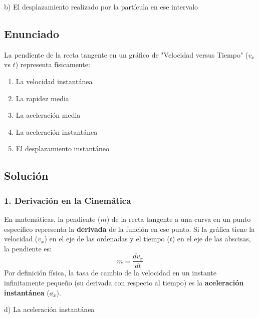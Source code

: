 \documentclass[12pt, a4paper]{article}
\begin{document}
\begin{tcolorbox}[colback=green!5!white, colframe=green!50!black, title=Respuesta Final]
\centering \Large b) El desplazamiento realizado por la partícula en ese intervalo
\end{tcolorbox}

\newpage

\subsection*{Enunciado}
La pendiente de la recta tangente en un gráfico de "Velocidad versus Tiempo" ($v_x$ vs $t$) representa físicamente:
\begin{enumerate}[label=\alph*)]
    \item La velocidad instantánea
    \item La rapidez media
    \item La aceleración media
    \item La aceleración instantánea
    \item El desplazamiento instantáneo
\end{enumerate}

\subsection*{Solución}

\subsubsection*{1. Derivación en la Cinemática}
En matemáticas, la pendiente ($m$) de la recta tangente a una curva en un punto específico representa la \textbf{derivada} de la función en ese punto.
Si la gráfica tiene la velocidad ($v_x$) en el eje de las ordenadas y el tiempo ($t$) en el eje de las abscisas, la pendiente es:
$$ m = \frac{dv_x}{dt} $$
Por definición física, la tasa de cambio de la velocidad en un instante infinitamente pequeño (su derivada con respecto al tiempo) es la \textbf{aceleración instantánea} ($a_x$).

\begin{tcolorbox}[colback=green!5!white, colframe=green!50!black, title=Respuesta Final]
\centering \Large d) La aceleración instantánea
\end{tcolorbox}

\newpage
\end{document}
